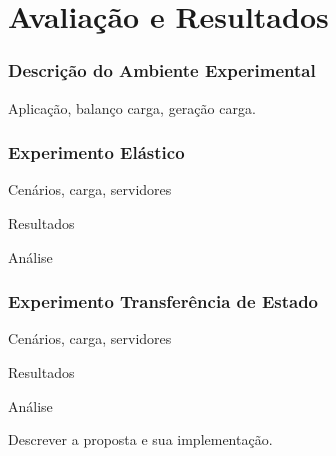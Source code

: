 \chapter{Avaliação e Resultados}\label{cap3}


\subsection{Descrição do Ambiente Experimental}

Aplicação, balanço carga, geração carga.

\subsection{Experimento Elástico}

Cenários, carga, servidores

Resultados

Análise


\subsection{Experimento Transferência de Estado}

Cenários, carga, servidores

Resultados

Análise


Descrever a proposta e sua implementação.

